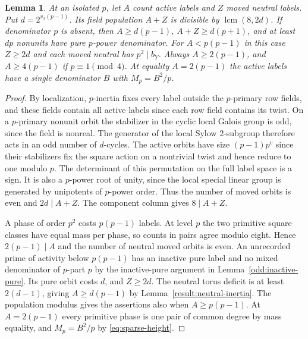 \documentclass[11pt]{amsart}
\numberwithin{equation}{section}
\newtheorem{lemma}[theorem]{Lemma}
\theoremstyle{definition}
\theoremstyle{plain}
\begin{document}
\begin{lemma}
At an isolated $p$, let $A$ count active labels and $Z$ moved neutral
labels. Put $d=2^{v_2(p-1)}$. Its field population $A+Z$ is divisible
by $\operatorname{lcm}(8,2d)$. If denominator $p$ is absent, then
$A\ge d(p-1)$, $A+Z\ge d(p+1)$, and at least $dp$ nonunits have
pure $p$-power denominator. For $A<p(p-1)$ in this case $Z\ge2d$
and each moved neutral has $p^2\mid b_Y$. Always $A\ge2(p-1)$, and
$A\ge4(p-1)$ if $p\equiv1\pmod4$. At equality $A=2(p-1)$ the
active labels have a single denominator $B$ with $M_p=B^2/p$.
\end{lemma}
\begin{proof}
By localization, $p$-inertia fixes every label outside the
$p$-primary row fields, and these fields contain all active labels
since each row field contains its twist. On a $p$-primary nonunit
orbit the stabilizer in the cyclic local Galois group is odd, since
the field is nonreal. The generator of the local Sylow $2$-subgroup therefore acts in an
odd number of $d$-cycles. The active orbits
have size $(p-1)p^v$ since their stabilizers fix the square action on
a nontrivial twist and hence reduce to one modulo $p$. The determinant of this permutation on the
full label space is a sign. It is also a $p$-power root of unity,
since the local special linear group is generated by unipotents of
$p$-power order. Thus the number of moved orbits is even and
$2d\mid A+Z$.
The component column gives $8\mid A+Z$.

A phase of order $p^2$ costs $p(p-1)$ labels. At level $p$ the two
primitive square classes have equal mass per phase, so counts in pairs
agree modulo eight. Hence $2(p-1)\mid A$ and the number of neutral
moved orbits is even. An unrecorded prime of activity below $p(p-1)$
has an inactive pure label and no mixed denominator of $p$-part $p$
by the inactive-pure argument in Lemma~\ref{odd:inactive-pure}.
Its pure orbit costs $d$, and $Z\ge2d$. The neutral torus deficit is
at least $2(d-1)$, giving $A\ge d(p-1)$ by
Lemma~\ref{result:neutral-inertia}. The population modulus gives
the assertions also when $A\ge p(p-1)$. At $A=2(p-1)$ every primitive
phase is one pair of common degree by mass equality, and
$M_p=B^2/p$ by \eqref{eq:sparse-height}.
\end{proof}
\end{document}
